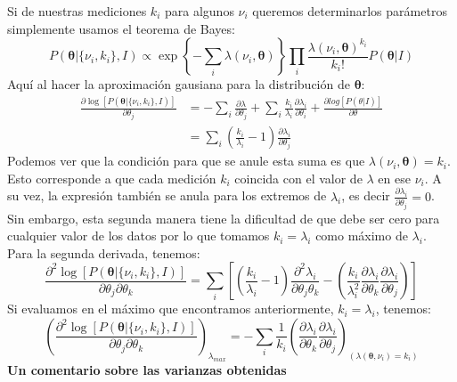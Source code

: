 \documentclass[aps,onecolumn,12pt,notitlepage]{revtex4-1}
\begin{document}
Si de nuestras mediciones $k_{i}$ para algunos $\nu_{i}$ queremos determinarlos parámetros simplemente usamos el teorema de Bayes:
\begin{equation}
P\left(\boldsymbol{\theta}| \{\nu_{i},k_{i}\},I\right) \propto    \exp\left\{-\sum_{i} \lambda\left( \nu_{i},\boldsymbol{\theta}\right)\right\} \prod_{i}\frac{\lambda\left(\nu_{i},\boldsymbol{\theta}\right)^{k_{i}}}{k_{i}!} P(\boldsymbol{\theta}|I)
\end{equation}
Aquí al hacer la aproximación gausiana para la distribución de $\boldsymbol{\theta}$:
\begin{equation}
\begin{aligned}
\frac{\partial \log \left[P\left(\boldsymbol{\theta} | \{ \nu_{i},k_{i} \},I \right)\right]}{ \partial \theta_{j}} &= -\sum_{i} \frac{\partial \lambda}{\partial \theta_{j}} + \sum_{i} \frac{k_{i}}{\lambda_{i}} \frac{\partial  \lambda_{i}}{\partial \theta_{i}}  + \frac{\partial log\left[P(\theta|I)\right]}{\partial \theta} \\
& = \sum_{i} \left( \frac{k_{i}}{\lambda_{i}} -1\right) \frac{\partial \lambda_{i}}{\partial \theta_{j}} 
\end{aligned}
\end{equation}
Podemos ver que la condición para que se anule esta suma es que $\lambda\left(\nu_{i},\boldsymbol{\theta}\right) = k_{i}$. Esto corresponde a que cada medición $k_{i}$ coincida con el valor de $\lambda$ en ese $\nu_{i}$. A su vez, la expresión también se anula para los extremos de $\lambda_{i}$, es decir $\frac{\partial \lambda_{i}}{\partial \theta_{j}} = 0$. Sin embargo, esta segunda manera tiene la dificultad de que debe ser cero para cualquier valor de los datos por lo que tomamos $k_{i}=\lambda_{i}$ como máximo de $\lambda_{i}$.
Para la segunda derivada, tenemos:
\begin{equation}
\frac{\partial^{2} \log \left[P\left(\boldsymbol{\theta} | \{ \nu_{i},k_{i} \},I \right)\right]}{ \partial \theta_{j} \partial \theta_{k}} =  \sum_{i} \left[ \left( \frac{k_{i}}{\lambda_{i}} -1\right) \frac{\partial^{2} \lambda_{i}}{\partial \theta_{j} \theta_{k}} - \left(\frac{k_{i}}{\lambda^{2}_{i}}\frac{\partial \lambda_{i}}{\partial \theta_{k}}\frac{\partial \lambda_{i}}{\partial \theta_{j}}  \right)\right]
\end{equation}
Si evaluamos en el máximo que encontramos anteriormente, $k_{i} = \lambda_{i}$, tenemos:
\begin{equation}
\left(\frac{\partial^{2} \log \left[P\left(\boldsymbol{\theta} | \{ \nu_{i},k_{i} \},I \right)\right]}{ \partial \theta_{j} \partial \theta_{k}}\right)_{\lambda_{max}}=  -\sum_{i}  \frac{1}{k_{i}}\left(\frac{\partial \lambda_{i}}{\partial \theta_{k}}\frac{\partial \lambda_{i}}{\partial \theta_{j}}\right)_{\left(\lambda (\boldsymbol{\theta},\nu_{i}) = k_{i}\right)}   
\end{equation}
\newpage
\textbf{Un comentario sobre las varianzas obtenidas}
\end{document}
